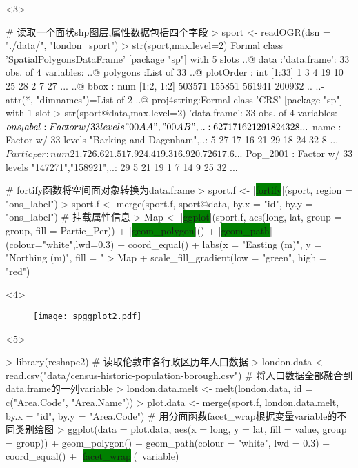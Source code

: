 \begin{frame}[t,fragile]{\subsecname}{\subsubsecname}
\begin{overlayarea}{\textwidth}{\textheight}
\begin{onlyenv}<3>
\begin{rcode}
# 读取一个面状shp图层,属性数据包括四个字段
> sport <- readOGR(dsn = "./data/", "london_sport")
> str(sport,max.level=2)
Formal class 'SpatialPolygonsDataFrame' [package "sp"] with 5 slots
  ..@ data       :'data.frame': 33 obs. of  4 variables:
  ..@ polygons   :List of 33
  ..@ plotOrder  : int [1:33] 1 3 4 19 10 25 28 2 7 27 ...
  ..@ bbox       : num [1:2, 1:2] 503571 155851 561941 200932
  .. ..- attr(*, "dimnames")=List of 2
  ..@ proj4string:Formal class 'CRS' [package "sp"] with 1 slot  
> str(sport@data,max.level=2)
'data.frame':   33 obs. of  4 variables:
 $ ons_label : Factor w/ 33 levels "00AA","00AB",..: 6 27 17 16 21 29 18 24 32 8 ...
 $ name      : Factor w/ 33 levels "Barking and Dagenham",..: 5 27 17 16 21 29 18 24 32 8 ...
 $ Partic_Per: num  21.7 26.6 21.5 17.9 24.4 19.3 16.9 20.7 26 17.6 ...
 $ Pop_2001  : Factor w/ 33 levels "147271","158921",..: 29 5 21 19 1 7 14 9 25 32 ...

# fortify函数将空间面对象转换为data.frame
> sport.f <- |\colorbox{green}{fortify}|(sport, region = "ons_label")
> sport.f <- merge(sport.f, sport@data, by.x = "id", by.y = "ons_label") # 挂载属性信息
> Map <- |\colorbox{green}{ggplot}|(sport.f, aes(long, lat, group = group, fill = Partic_Per)) + |\colorbox{green}{geom\_polygon}|() + |\colorbox{green}{geom\_path}|(colour="white",lwd=0.3) + coord_equal() + labs(x = "Easting (m)", y = "Northing (m)", fill = "%
> Map + scale_fill_gradient(low = "green", high = "red")
\end{rcode}
\end{onlyenv}

\begin{onlyenv}<4>
\begin{figure}[ht] \vspace{-20pt}
  \centering 
  \texttt{[image: spggplot2.pdf]}
\end{figure}
\end{onlyenv}

\begin{onlyenv}<5>
\begin{rcode}
> library(reshape2)
# 读取伦敦市各行政区历年人口数据
> london.data <- read.csv("data/census-historic-population-borough.csv")
# 将人口数据全部融合到data.frame的一列variable
> london.data.melt <- melt(london.data, id = c("Area.Code", "Area.Name"))
> plot.data <- merge(sport.f, london.data.melt, by.x = "id", by.y = "Area.Code")
# 用分面函数facet_wrap根据变量variable的不同类别绘图
> ggplot(data = plot.data, aes(x = long, y = lat, fill = value, group = group)) + 
         geom_polygon() + 
         geom_path(colour = "white", lwd = 0.3) + 
         coord_equal() + 
        |\colorbox{green}{facet\_wrap}|(~variable)
\end{rcode}
\end{onlyenv}


\end{overlayarea}
\end{frame}
